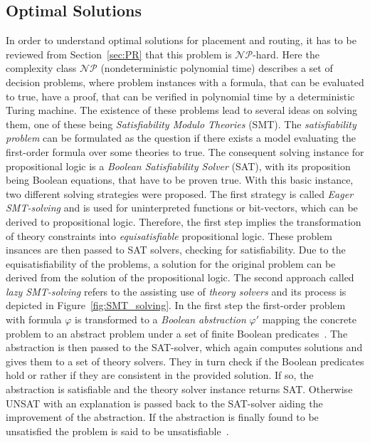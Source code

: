 \subsection{Optimal Solutions}
In order to understand optimal solutions for placement and routing, it has to be reviewed from Section~\ref{sec:PR} that this problem is $\mathcal{NP}$-hard. Here the complexity class $\mathcal{NP}$ (nondeterministic polynomial time) describes a set of decision problems, where problem instances with a formula, that can be evaluated to true, have a proof, that can be verified in polynomial time by a deterministic Turing machine. The existence of these problems lead to several ideas on solving them, one of these being \emph{Satisfiability Modulo Theories} (SMT). The \emph{satisfiability problem} can be formulated as the question if there exists a model evaluating the first-order formula over some theories to true. The consequent solving instance for propositional logic is a \emph{Boolean Satisfiability Solver} (SAT), with its proposition being Boolean equations, that have to be proven true. With this basic instance, two different solving strategies were proposed. The first strategy is called \emph{Eager SMT-solving} and is used for uninterpreted functions or bit-vectors, which can be derived to propositional logic. Therefore, the first step implies the transformation of theory constraints into \emph{equisatisfiable} propositional logic. These problem insances are then passed to SAT solvers, checking for satisfiability. Due to the equisatisfiability of the problems, a solution for the original problem can be derived from the solution of the propositional logic. The second approach called \emph{lazy SMT-solving} refers to the assisting use of \emph{theory solvers} and its process is depicted in Figure~\ref{fig:SMT_solving}. In the first step the first-order problem with formula $\varphi$ is transformed to a \emph{Boolean abstraction} $\varphi'$ mapping the concrete problem to an abstract problem under a set of finite Boolean predicates~\cite{boolean_abstraction}. The abstraction is then passed to the SAT-solver, which again computes solutions and gives them to a set of theory solvers. They in turn check if the Boolean predicates hold or rather if they are consistent in the provided solution. If so, the abstraction is satisfiable and the theory solver instance returns SAT. Otherwise UNSAT with an explanation is passed back to the SAT-solver aiding the improvement of the abstraction. If the abstraction is finally found to be unsatisfied the problem is said to be unsatisfiable~\cite{SMT}.

